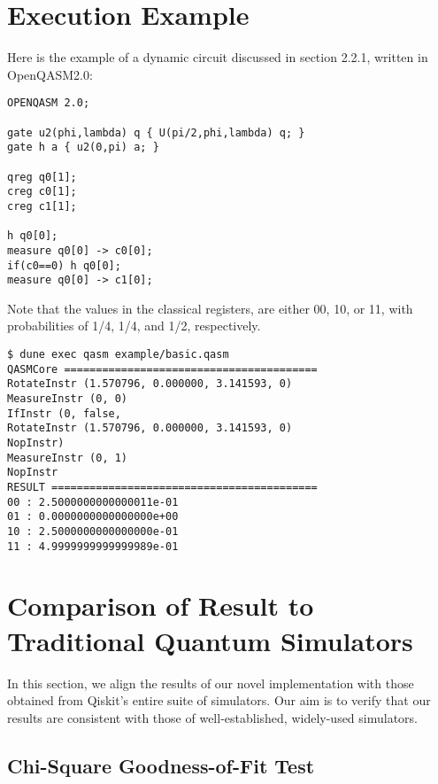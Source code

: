 \documentclass[10pt,a4paper]{article}
\newcommand{\<}{\langle}
\renewcommand{\>}{\rangle}
\begin{document}
\section{Execution Example}

Here is the example of a dynamic circuit discussed in section 2.2.1, written in OpenQASM2.0:\\
\begin{lstlisting}
OPENQASM 2.0;

gate u2(phi,lambda) q { U(pi/2,phi,lambda) q; }
gate h a { u2(0,pi) a; }

qreg q0[1];
creg c0[1];
creg c1[1];

h q0[0];
measure q0[0] -> c0[0];
if(c0==0) h q0[0];
measure q0[0] -> c1[0];
\end{lstlisting}

Note that the values in the classical registers, are either 00, 10, or 11, with probabilities of
1/4, 1/4, and 1/2, respectively.
\\

\begin{lstlisting}
$ dune exec qasm example/basic.qasm
QASMCore ========================================
RotateInstr (1.570796, 0.000000, 3.141593, 0)
MeasureInstr (0, 0)
IfInstr (0, false,
RotateInstr (1.570796, 0.000000, 3.141593, 0)
NopInstr)
MeasureInstr (0, 1)
NopInstr
RESULT ==========================================
00 : 2.5000000000000011e-01
01 : 0.0000000000000000e+00
10 : 2.5000000000000000e-01
11 : 4.9999999999999989e-01
\end{lstlisting}



\section{Comparison of Result to Traditional Quantum Simulators}

In this section, we align the results of our novel implementation with those obtained from Qiskit's
entire suite of simulators. Our aim is to verify that our results are consistent with those of
well-established, widely-used simulators.

\subsection{Chi-Square Goodness-of-Fit Test}
\end{document}
